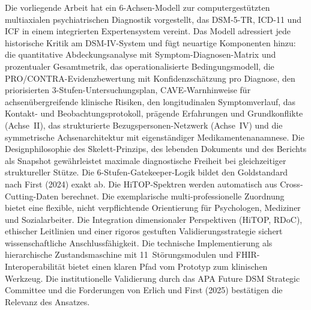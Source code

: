 \documentclass[11pt,a4paper]{article}
\begin{document}
Die vorliegende Arbeit hat ein 6-Achsen-Modell zur computergest\"utzten multiaxialen psychiatrischen Diagnostik vorgestellt, das DSM-5-TR, ICD-11 und ICF in einem integrierten Expertensystem vereint. Das Modell adressiert jede historische Kritik am DSM-IV-System und f\"ugt neuartige Komponenten hinzu: die quantitative Abdeckungsanalyse mit Symptom-Diagnosen-Matrix und prozentualer Gesamtmetrik, das operationalisierte Bedingungsmodell, die PRO/CONTRA-Evidenzbewertung mit Konfidenzsch\"atzung pro Diagnose, den priorisierten 3-Stufen-Untersuchungsplan, CAVE-Warnhinweise f\"ur achsen\"ubergreifende klinische Risiken, den longitudinalen Symptomverlauf, das Kontakt- und Beobachtungsprotokoll, pr\"agende Erfahrungen und Grundkonflikte (Achse~II), das strukturierte Bezugspersonen-Netzwerk (Achse~IV) und die symmetrische Achsenarchitektur mit eigenst\"andiger Medikamentenanamnese. Die Designphilosophie des Skelett-Prinzips, des lebenden Dokuments und des Berichts als Snapshot gew\"ahrleistet maximale diagnostische Freiheit bei gleichzeitiger struktureller St\"utze. Die 6-Stufen-Gatekeeper-Logik bildet den Goldstandard nach First (2024) exakt ab. Die HiTOP-Spektren werden automatisch aus Cross-Cutting-Daten berechnet. Die exemplarische multi-professionelle Zuordnung bietet eine flexible, nicht verpflichtende Orientierung f\"ur Psychologen, Mediziner und Sozialarbeiter. Die Integration dimensionaler Perspektiven (HiTOP, RDoC), ethischer Leitlinien und einer rigoros gestuften Validierungsstrategie sichert wissenschaftliche Anschlussf\"ahigkeit. Die technische Implementierung als hierarchische Zustandsmaschine mit 11~St\"orungsmodulen und FHIR-Interoperabilit\"at bietet einen klaren Pfad vom Prototyp zum klinischen Werkzeug. Die institutionelle Validierung durch das APA Future DSM Strategic Committee und die Forderungen von Erlich und First (2025) best\"atigen die Relevanz des Ansatzes.


\end{document}
